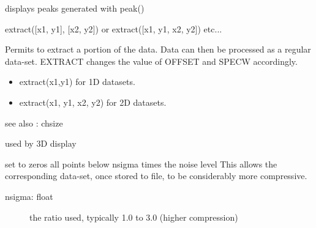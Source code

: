 \documentclass[letterpaper,10pt,openany,oneside]{sphinxmanual}
\begin{document}
\begin{fulllineitems}
\begin{fulllineitems}
\end{fulllineitems}


\begin{fulllineitems}
\label{rst/code:NPKData.NPKData.display_peaks}
displays peaks generated with peak()

\end{fulllineitems}


\begin{fulllineitems}
\label{rst/code:NPKData.NPKData.extract}
extract({[}x1, y1{]}, {[}x2, y2{]}) or extract({[}x1, y1, x2, y2{]})
etc...

Permits to extract a portion of the data.
Data can then be processed as a regular data-set.
EXTRACT changes the value of OFFSET and SPECW accordingly.
\begin{itemize}
\item {} 
extract(x1,y1) for 1D datasets.

\item {} 
extract(x1, y1, x2, y2) for 2D datasets.

\end{itemize}

see also : chsize

\end{fulllineitems}


\begin{fulllineitems}
\label{rst/code:NPKData.NPKData.f}
used by 3D display

\end{fulllineitems}


\begin{fulllineitems}
\label{rst/code:NPKData.NPKData.fastclean}
set to zeros all points below nsigma times the noise level
This allows the corresponding data-set, once stored to file, to be considerably more compressive.
\begin{description}
\item[{nsigma: float}] \leavevmode
the ratio used, typically 1.0 to 3.0 (higher compression)


\end{description}
\end{fulllineitems}
\end{fulllineitems}
\end{document}
